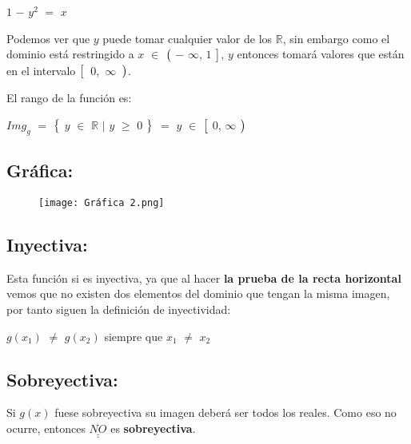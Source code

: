 \documentclass[12pt]{article}
\def\doubleunderline#1{\underline{\underline{#1}}}
\begin{document}
\hspace{4cm} $1$ $-$ $y^{2}$ $=$ $x$ \vspace{0.5cm}

Podemos ver que $y$ puede tomar cualquier valor de los $\mathbb{R}$, sin embargo como el dominio está restringido a $x$ $\in$ $\big{(}$ $-$ $\infty$, $1$ $\big{]}$, $y$ entonces tomará valores que están en el intervalo \mbox{$\big{[}$ $0$, $\infty$ $\big{)}$}. \vspace{0.5cm}

El rango de la función es: \vspace{0.5cm}

\hspace{4cm} $Img_{g}$ $=$ $\big{\{}$ $y$ $\in$ $\mathbb{R}$ $\mid$  $y$ $\geq$ $0$ $\big{\}}$ $=$ $y$ $\in$ $\big{[}$ $0$, $\infty$ $\big{)}$ \vspace{0.5cm}

\subsection*{{\textcolor{Lochinvar}{\bfseries{Gráfica}:}}} \vspace{0.5cm}

\begin{figure}[htb] \centering

    \texttt{[image: Gráfica 2.png]} 

\end{figure} \vspace{0.5cm}

\subsection*{{\textcolor{Lochinvar}{\bfseries{Inyectiva}:}}} Esta función si es inyectiva, ya que al hacer {\bfseries{la prueba de la recta horizontal}} vemos que no existen dos elementos del dominio que tengan la misma imagen, por tanto siguen la definición de inyectividad: \vspace{0.5cm}

\hspace{4cm} $g(x_{1})$ $\neq$ $g(x_{2})$ siempre que $x_{1}$ $\neq$ $x_{2}$ \vspace{0.5cm}

\subsection*{{\textcolor{Lochinvar}{\bfseries{Sobreyectiva}:}}} Si $g(x)$ fuese sobreyectiva su imagen deberá ser todos los reales. Como eso no ocurre, entonces {$\doubleunderline{NO}$} es {\bfseries{sobreyectiva}}. \vspace{0.5cm}
\end{document}
